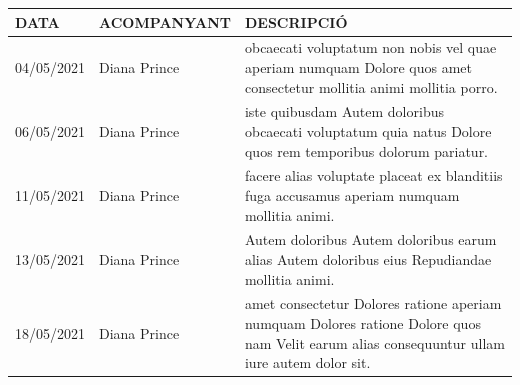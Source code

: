 \documentclass[a4paper,12pt]{elsarticle}  %
\begin{document}
	\begin{longtable}{p{}lp{}}
		

		
		\hline
		\textbf{DATA} & \textbf{ACOMPANYANT} & \textbf{DESCRIPCIÓ}\\
		\hline
			 04/05/2021 & Diana Prince & obcaecati voluptatum non nobis vel quae aperiam numquam Dolore quos amet consectetur mollitia animi mollitia porro. \\ 
			 06/05/2021 & Diana Prince & iste quibusdam Autem doloribus obcaecati voluptatum quia natus Dolore quos rem temporibus dolorum pariatur. \\ 
			 11/05/2021 & Diana Prince & facere alias voluptate placeat ex blanditiis fuga accusamus aperiam numquam mollitia animi. \\ 
			 13/05/2021 & Diana Prince & Autem doloribus Autem doloribus earum alias Autem doloribus eius Repudiandae mollitia animi. \\ 
			 18/05/2021 & Diana Prince & amet consectetur Dolores ratione aperiam numquam Dolores ratione Dolore quos nam Velit earum alias consequuntur ullam iure autem dolor sit. \\ 
		
	\end{longtable}
\end{document}
